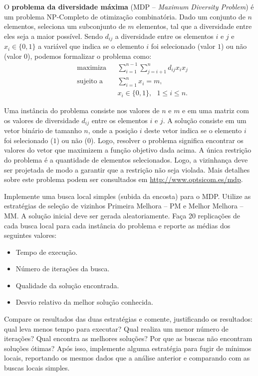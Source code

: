 \begin{exercise}	
O \textbf{problema da diversidade máxima} (MDP -- \textit{Maximum Diversity Problem}) é um problema NP-Completo de otimização combinatória. Dado um conjunto de $n$ elementos, seleciona um subconjunto de $m$ elementos, tal que a diversidade entre eles seja a maior possível. Sendo $d_{ij}$ a diversidade entre os elementos $i$ e $j$ e $x_i \in \{0, 1\}$ a variável que indica se o elemento $i$ foi selecionado (valor $1$) ou não (valor $0$), podemos formalizar o problema como:
$$
\begin{aligned}
	& \text{maximiza} & & \sum_{i = 1}^{n-1} \sum_{j = i + 1}^{n} d_{ij} x_i x_j \\
	& \text{sujeito a} & & \sum_{i = 1}^{n} x_i = m, \\
	& & & x_i \in \{0, 1\}, \textbf{   } 1 \le i \le n.
\end{aligned}
$$

Uma instância do problema consiste nos valores de $n$ e $m$ e em uma matriz com os valores de diversidade $d_{ij}$ entre os elementos $i$ e $j$. A solução consiste em um vetor binário de tamanho $n$, onde a posição $i$ deste vetor indica se o elemento $i$ foi selecionado ($1$) ou não ($0$). Logo, resolver o problema significa encontrar os valores do vetor que maximizem a função objetivo dada acima. A única restrição do problema é a quantidade de elementos selecionados. Logo, a vizinhança deve ser projetada de modo a garantir que a restrição não seja violada. Mais detalhes sobre este problema podem ser consultados em \url{http://www.optsicom.es/mdp}.

Implemente uma busca local simples (subida da encosta) para o MDP. Utilize as estratégias de seleção de vizinhos Primeira Melhora -- PM e Melhor Melhora -- MM. A solução inicial deve ser gerada aleatoriamente. Faça 20 replicações de cada busca local para cada instância do problema e reporte as médias dos seguintes valores:

\begin{itemize}
	\item Tempo de execução.
	\item Número de iterações da busca.
	\item Qualidade da solução encontrada.
	\item Desvio relativo da melhor solução conhecida.
\end{itemize}

Compare os resultados das duas estratégias e comente, justificando os resultados: qual leva menos tempo para executar? Qual realiza um menor número de iterações? Qual encontra as melhores soluções? Por que as buscas não encontram soluções ótimas? Após isso, implemente alguma estratégia para fugir de mínimos locais, reportando os mesmos dados que a análise anterior e comparando com as buscas locais simples.


\end{exercise}
